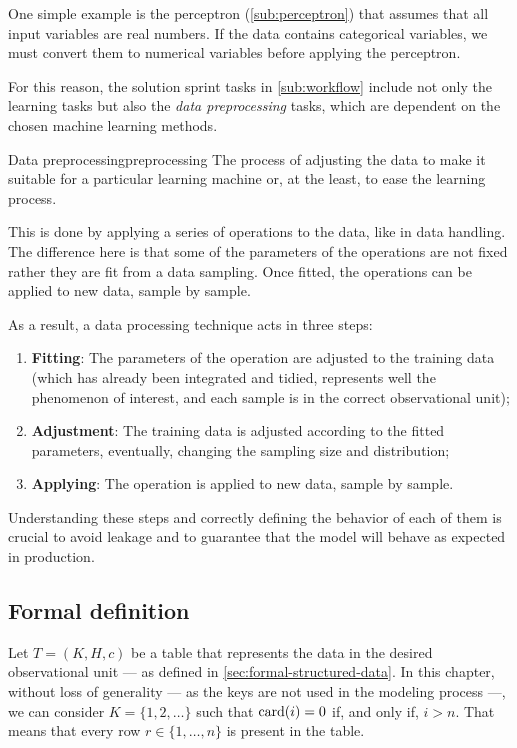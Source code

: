 One simple example is the perceptron (\cref{sub:perceptron}) that assumes that all
input variables are real numbers.  If the data contains categorical variables, we must
convert them to numerical variables before applying the perceptron.

For this reason, the solution sprint tasks in \cref{sub:workflow} include not only the
learning tasks but also the \emph{data preprocessing} tasks, which are dependent on the
chosen machine learning methods.

\begin{defbox}{Data preprocessing}{preprocessing}
  The process of adjusting the data to make it suitable for a particular learning machine
  or, at the least, to ease the learning process.
\end{defbox}

This is done by applying a series of operations to the data, like in data handling.  The
difference here is that some of the parameters of the operations are not fixed rather they
are fit from a data sampling.  Once fitted, the operations can be applied to
new data, sample by sample.

As a result, a data processing technique acts in three steps:
\begin{enumerate}
  \itemsep0em
  \item \textbf{Fitting}: The parameters of the operation are adjusted to the training
    data (which has already been integrated and tidied, represents well the phenomenon of
    interest, and each sample is in the correct observational unit);
  \item \textbf{Adjustment}: The training data is adjusted according to the fitted
    parameters, eventually, changing the sampling size and distribution;
  \item \textbf{Applying}: The operation is applied to new data, sample by sample.
\end{enumerate}

Understanding these steps and correctly defining the behavior of each of them is crucial
to avoid \gls{leakage} and to guarantee that the model will behave as expected in
production.

\subsection{Formal definition}

Let $T = (K, H, c)$ be a table that represents the data in the desired observational unit
--- as defined in \cref{sec:formal-structured-data}.  In this chapter, without loss of
generality --- as the keys are not used in the modeling process ---, we can consider $K =
\{1, 2, \dots\}$ such that $\rowcard[i] = 0$ if, and only if, $i > n$.  That means that
every row $r \in \{1, \dots, n\}$ is present in the table.

